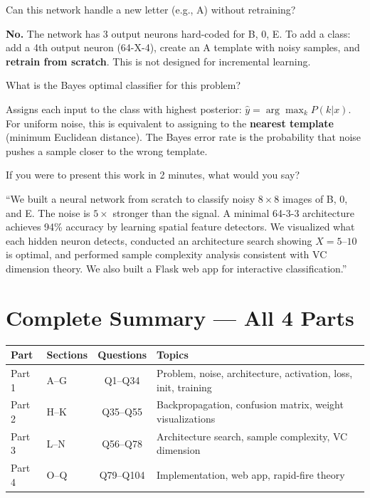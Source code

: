 \documentclass[11pt,a4paper]{article}
\newcounter{qcounter}
\newcommand{\vq}[1]{\stepcounter{qcounter}\begin{tcolorbox}[qbox, title=Q\theqcounter]#1\end{tcolorbox}}
\newcommand{\va}[1]{\begin{tcolorbox}[abox, title=Answer]#1\end{tcolorbox}\vspace{6pt}}
\begin{document}
\vq{Can this network handle a new letter (e.g., A) without retraining?}
\va{\textbf{No.} The network has 3 output neurons hard-coded for B, 0, E. To add a class: add a 4th output neuron (64-X-4), create an A template with noisy samples, and \textbf{retrain from scratch}. This is not designed for incremental learning.}

\vq{What is the Bayes optimal classifier for this problem?}
\va{Assigns each input to the class with highest posterior: $\hat{y} = \arg\max_k P(k|x)$. For uniform noise, this is equivalent to assigning to the \textbf{nearest template} (minimum Euclidean distance). The Bayes error rate is the probability that noise pushes a sample closer to the wrong template.}

\vq{If you were to present this work in 2 minutes, what would you say?}
\va{``We built a neural network from scratch to classify noisy $8\times 8$ images of B, 0, and E. The noise is $5\times$ stronger than the signal. A minimal 64-3-3 architecture achieves 94\% accuracy by learning spatial feature detectors. We visualized what each hidden neuron detects, conducted an architecture search showing $X=5$--$10$ is optimal, and performed sample complexity analysis consistent with VC dimension theory. We also built a Flask web app for interactive classification.''}

\section*{Complete Summary --- All 4 Parts}

\begin{center}
\begin{tabular}{llcl}
\toprule
\textbf{Part} & \textbf{Sections} & \textbf{Questions} & \textbf{Topics} \\
\midrule
Part 1 & A--G & Q1--Q34 & Problem, noise, architecture, activation, loss, init, training \\
Part 2 & H--K & Q35--Q55 & Backpropagation, confusion matrix, weight visualizations \\
Part 3 & L--N & Q56--Q78 & Architecture search, sample complexity, VC dimension \\
Part 4 & O--Q & Q79--Q104 & Implementation, web app, rapid-fire theory \\
\bottomrule
\end{tabular}
\end{center}
\end{document}
